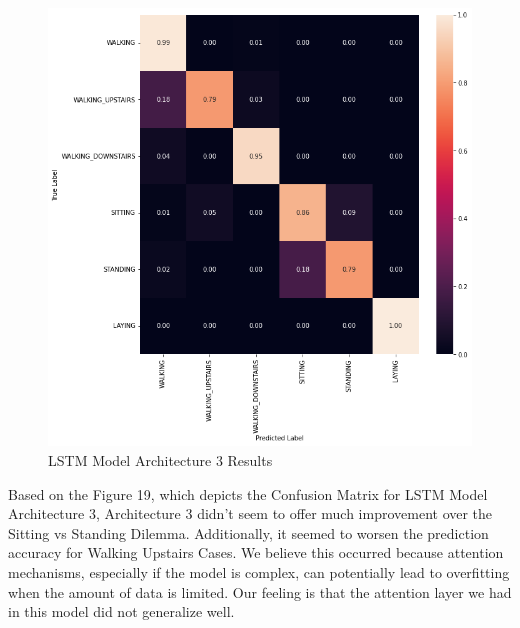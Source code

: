 \documentclass[conference]{IEEEtran}
\begin{document}
\begin{figure}[h!]
	\includegraphics[width= 0.9 \linewidth]{LSTM(3)_Results.png}
	\centering
	\caption{LSTM Model Architecture 3 Results}
	\label{LSTM(3)_Results.png}
\end{figure}

Based on the Figure 19, which depicts the Confusion Matrix for LSTM Model Architecture 3, Architecture 3 didn't seem to offer much improvement over the Sitting vs Standing Dilemma. Additionally, it seemed to worsen the prediction accuracy for Walking Upstairs Cases. We believe this occurred because attention mechanisms, especially if the model is complex, can potentially lead to overfitting when the amount of data is limited. Our feeling is that the attention layer we had in this model did not generalize well. 
\end{document}
